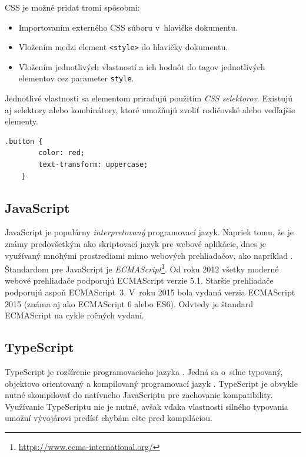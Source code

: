 \noindent CSS je možné pridať tromi spôsobmi: 
\begin{itemize}
	\item Importovaním externého CSS súboru v~hlavičke dokumentu.
	\item Vložením medzi element \texttt{<style>} do hlavičky dokumentu.
	\item Vložením jednotlivých vlastností a ich hodnôt do tagov jednotlivých elementov cez parameter \texttt{style}.
\end{itemize}

\noindent Jednotlivé vlastnosti sa elementom priraďujú použitím \emph{CSS selektorov}. Existujú aj selektory alebo kombinátory, ktoré umožňujú zvoliť rodičovské alebo vedľajšie elementy. \cite{MDN} \\

\begin{lstlisting}[caption=Príklad zápisu v~jazyku CSS.]
	.button {
		color: red;
		text-transform: uppercase;
	}
\end{lstlisting}

\subsection{JavaScript}
\label{subsection:javascript}
JavaScript je populárny \emph{interpretovaný} programovací jazyk. Napriek tomu, že je známy predovšetkým ako skriptovací jazyk pre webové aplikácie, dnes je využívaný mnohými prostrediami mimo webových prehliadačov, ako napríklad . \cite{MDN} \\

\noindent Štandardom pre JavaScript je \emph{ECMAScript}\footnote{\href{https://www.ecma-international.org/}{https://www.ecma-international.org/}}. Od roku 2012 všetky moderné webové prehliadače podporujú ECMAScript verzie 5.1. Staršie prehliadače podporujú aspoň ECMAScript~3. V~roku 2015 bola vydaná verzia ECMAScript 2015 (známa aj ako ECMAScript 6 alebo ES6). Odvtedy je štandard ECMAScript na cykle ročných vydaní. \cite{MDN}

\subsection{TypeScript}
\label{subsection:typescript}
TypeScript je rozšírenie programovacieho jazyka . Jedná sa o~silne typovaný, objektovo orientovaný a kompilovaný programovací jazyk \cite{TSWeb}. TypeScript je obvykle nutné skompilovať do natívneho JavaScriptu pre zachovanie kompatibility. Využívanie TypeScriptu nie je nutné, avšak vďaka vlastnosti silného typovania umožní vývojárovi predísť chybám ešte pred kompiláciou. \\

